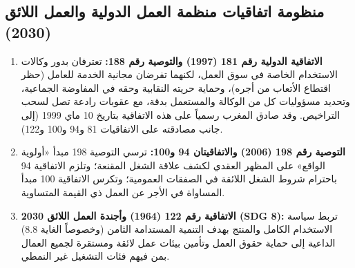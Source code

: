 \subsection{منظومة اتفاقيات منظمة العمل الدولية والعمل اللائق (2030)}
\begin{enumerate}[leftmargin=*, itemsep=6pt]
    \item \textbf{الاتفاقية الدولية رقم \textenglish{181} (\textenglish{1997}) والتوصية رقم \textenglish{188}:} تعترفان بدور وكالات الاستخدام الخاصة في سوق العمل، لكنهما تفرضان مجانية الخدمة للعامل (حظر اقتطاع الأتعاب من أجره)، وحماية حريته النقابية وحقه في المفاوضة الجماعية، وتحديد مسؤوليات كل من الوكالة والمستعمل بدقة، مع عقوبات رادعة تصل لسحب التراخيص. وقد صادق المغرب رسمياً على هذه الاتفاقية بتاريخ \textenglish{10} ماي \textenglish{1999} (إلى جانب مصادقته على الاتفاقيات \textenglish{81} و\textenglish{94} و\textenglish{100} و\textenglish{122}).
    \item \textbf{التوصية رقم \textenglish{198} (\textenglish{2006}) والاتفاقيتان \textenglish{94} و\textenglish{100}:} ترسي التوصية \textenglish{198} مبدأ «أولوية الواقع» على المظهر العقدي لكشف علاقة الشغل المقنعة؛ وتلزم الاتفاقية \textenglish{94} باحترام شروط الشغل اللائقة في الصفقات العمومية؛ وتكرس الاتفاقية \textenglish{100} مبدأ المساواة في الأجر عن العمل ذي القيمة المتساوية.
    \item \textbf{الاتفاقية رقم \textenglish{122} (\textenglish{1964}) وأجندة العمل اللائق \textenglish{2030} (\textenglish{SDG 8}):} تربط سياسة الاستخدام الكامل والمنتج بهدف التنمية المستدامة الثامن (وخصوصاً الغاية \textenglish{8.8}) الداعية إلى حماية حقوق العمل وتأمين بيئات عمل لائقة ومستقرة لجميع العمال بمن فيهم فئات التشغيل غير النمطي.
\end{enumerate}

